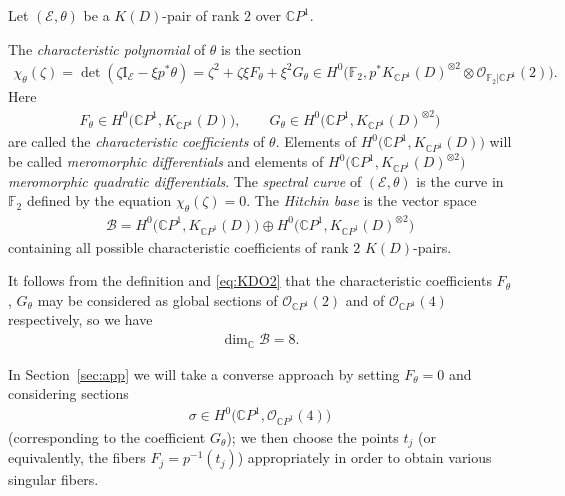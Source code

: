 \documentclass[10pt,a4paper]{amsart}
\newcommand{\C}{{\mathbb C}} %
\renewcommand{\O}{{\mathcal O}} %
\newcommand{\CP}[1]{\mathbb{C}P^{#1}} %
\newcommand{\E}{{\mathcal E}} %
\numberwithin{equation}{section}
\begin{document}
Let $(\E, \theta)$ be a $K(D)$-pair of rank $2$ over $\CP1$.
\begin{defn}
The {\it characteristic polynomial} of $\theta$ is the section
\begin{gather}\label{eq:char-poly1}
 \chi_{\theta} (\zeta ) = \det (\zeta \mbox{I}_{\E} - \xi p^* \theta) = \zeta^2 + \zeta \xi F_{\theta} + \xi^2 G_{\theta} \in H^0 \big({\mathbb {F}}_2 ,p^* K_{\CP1}(D)^{\otimes 2} \otimes \O_{{\mathbb {F}}_2 | \CP1}(2) \big).\!\!\!
\end{gather}
Here
 \begin{gather*}
 F_{\theta}\in H^0\big(\CP1 , K_{\CP1}(D) \big), \qquad G_{\theta} \in H^0\big(\CP1 , K_{\CP1}(D)^{\otimes 2} \big)
 \end{gather*}
 are called the {\it characteristic coefficients} of $\theta$. Elements of $H^0\big(\CP1 , K_{\CP1}(D)\big)$ will be called {\it meromorphic differentials} and
 elements of $H^0\big(\CP1 , K_{\CP1}(D)^{\otimes 2}\big)$ {\it meromorphic quadratic dif\-fe\-rentials}.
 The {\it spectral curve} of $(\E , \theta )$ is the curve in ${\mathbb {F}}_2$ defined by the equation $\chi_{\theta} (\zeta ) = 0$.
 The {\it Hitchin base} is the vector space
 \begin{gather*}
 \mathcal{B} = H^0\big(\CP1 , K_{\CP1}(D) \big) \oplus H^0\big(\CP1 , K_{\CP1}(D)^{\otimes 2} \big)
 \end{gather*}
 containing all possible characteristic coefficients of rank $2$ $K(D)$-pairs.
\end{defn}
It follows from the definition and \eqref{eq:KDO2} that the
characteristic coefficients $F_{\theta}$, $G_{\theta}$ may be considered
as global sections of $\O_{\CP1}(2)$ and of $\O_{\CP1}(4)$ respectively, so we have
\begin{gather*}
 \dim_{\C} \mathcal{B} = 8.
\end{gather*}
\begin{Remark}
In Section~\ref{sec:app} we will take a converse approach by setting $F_{\theta} = 0$ and considering sections
\begin{gather*}
 \sigma \in H^0 \big(\CP1 , \O_{\CP1} (4) \big)
\end{gather*}
(corresponding to the coefficient $G_{\theta}$); we then choose the points $t_j$ (or equivalently, the fibers $F_j = p^{-1}(t_j)$) appropriately in order to obtain various singular fibers.
\end{Remark}
\end{document}
